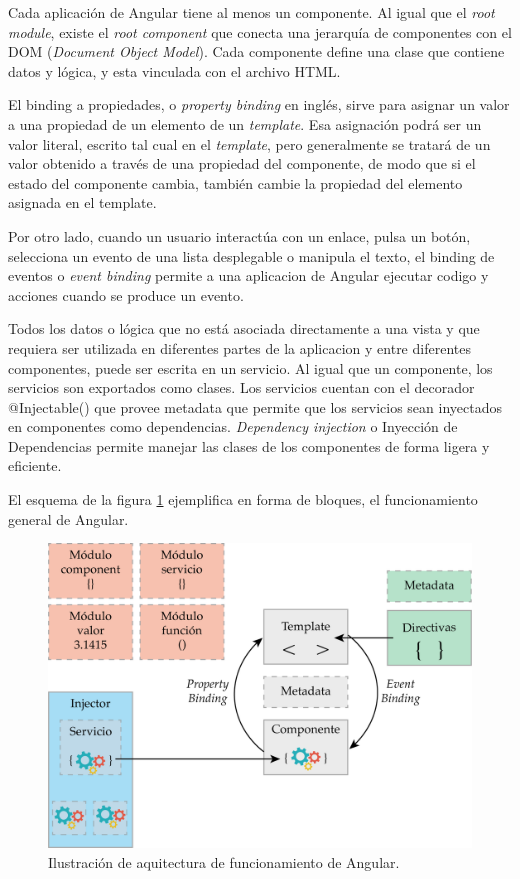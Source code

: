 Cada aplicación de Angular tiene al menos un componente. Al igual que el \textit{root module}, existe el \textit{root component} que conecta una jerarquía de componentes con el DOM (\textit{Document Object Model})\citep{WEBSITE:31}.  Cada componente define una clase que contiene datos y lógica, y esta vinculada con el archivo HTML.

El binding a propiedades, o \textit{property binding} en inglés, sirve para asignar un valor a una propiedad de un elemento de un \textit{template}. Esa asignación podrá ser un valor literal, escrito tal cual en el \textit{template}, pero generalmente se tratará de un valor obtenido a través de una propiedad del componente, de modo que si el estado del componente cambia, también cambie la propiedad del elemento asignada en el template.

Por otro lado, cuando un usuario interactúa con un enlace, pulsa un botón, selecciona un evento de una lista desplegable o manipula el texto, el binding de eventos o \textit{event binding} permite a una aplicacion de Angular ejecutar codigo y acciones cuando se produce un evento.

Todos los datos o lógica que no está asociada directamente a una vista y que requiera ser utilizada en diferentes partes de la aplicacion y entre diferentes componentes, puede ser escrita en un servicio. Al igual que un componente, los servicios son exportados como clases. Los servicios cuentan con el decorador @Injectable() que provee metadata que permite que los servicios sean inyectados en componentes como dependencias.  \textit{Dependency injection} o Inyección de Dependencias permite manejar las clases de los componentes de forma ligera y eficiente. 

El esquema de la figura \ref{fig:esquema-angular} ejemplifica en forma de bloques, el funcionamiento general de Angular.

\begin{figure}[htpb]
	\centering
	\includegraphics[scale=.7]{./Figures/angular-esquema.png}
	\caption[Arquitectura de funcionamiento de Angular ]{Ilustración de aquitectura de funcionamiento de Angular\protect\footnotemark.}
	\label{fig:esquema-angular}
\end{figure}


